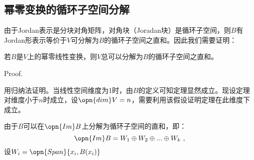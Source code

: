 \subsection{幂零变换的循环子空间分解}

由于Jordan表示是分块对角矩阵，对角块（Joradan块）是循环子空间，则$B$有Jordan形表示等价于$V$可分解为$B$的循环子空间之直和。因此我们需要证明：

\begin{theorem}{}
若$B$是$V$上的幂零线性变换，则$V$总可以分解为$B$的循环子空间之直和。
\end{theorem}
Proof.

用归纳法证明。当线性空间维度为1时，由$B$的定义可知定理显然成立。现设定理对维度小于$n$时成立，设$\opn{dim}V=n$，需要利用该假设证明定理在此维度下成立。

由于$B$可以在$\opn{Im}B$上分解为循环子空间的直和，即：
\begin{equation}
\opn{Im}B=W_1\oplus W_2\oplus...\oplus W_k~,
\end{equation}
设$W_i=\opn{Span}{x_i,B(x_i)}$

